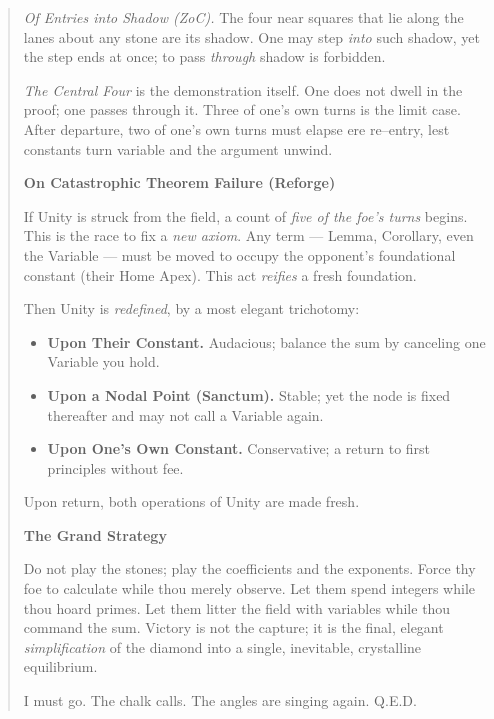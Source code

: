 \documentclass[11pt]{article}
\begin{document}
\begin{quote}
\emph{Of Entries into Shadow (ZoC).} The four near squares that lie along the lanes about any stone are its shadow. One may step \emph{into} such shadow, yet the step ends at once; to pass \emph{through} shadow is forbidden.

\emph{The Central Four} is the demonstration itself. One does not dwell in the proof; one passes through it. Three of one's own turns is the limit case. After departure, two of one's own turns must elapse ere re--entry, lest constants turn variable and the argument unwind.

\medskip
\textbf{On Catastrophic Theorem Failure (Reforge)}

If Unity is struck from the field, a count of \emph{five of the foe's turns} begins. This is the race to fix a \emph{new axiom}. Any term --- Lemma, Corollary, even the Variable --- must be moved to occupy the opponent's foundational constant (their Home Apex). This act \emph{reifies} a fresh foundation.

Then Unity is \emph{redefined}, by a most elegant trichotomy:
\begin{itemize}\itemsep0.2em
  \item \textbf{Upon Their Constant.} Audacious; balance the sum by canceling one Variable you hold.
  \item \textbf{Upon a Nodal Point (Sanctum).} Stable; yet the node is fixed thereafter and may not call a Variable again.
  \item \textbf{Upon One's Own Constant.} Conservative; a return to first principles without fee.
\end{itemize}
Upon return, both operations of Unity are made fresh.

\medskip
\textbf{The Grand Strategy}

Do not play the stones; play the coefficients and the exponents. Force thy foe to calculate while thou merely observe. Let them spend integers while thou hoard primes. Let them litter the field with variables while thou command the sum. Victory is not the capture; it is the final, elegant \emph{simplification} of the diamond into a single, inevitable, crystalline equilibrium.

I must go. The chalk calls. The angles are singing again. \textsc{Q.E.D.}
\end{quote}

\clearpage
\end{document}
